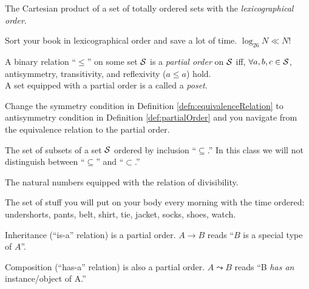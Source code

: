  \begin{exm}
   The Cartesian product of a set of totally ordered sets
   with the \emph{lexicographical order}.
 \end{exm}

 \begin{exm}
   Sort your book in lexicographical order
    and save a lot of time.
   $\log_{26}N \ll N$!
 \end{exm}

 \begin{defn}
   \label{def:partialOrder}
   A binary relation ``$\le$'' on some set ${\cal S}$
    is a \emph{partial order} on ${\cal S}$
    iff, $\forall a,b,c\in{\cal S}$,
    antisymmetry, transitivity, and reflexivity ($a\le a$)
    hold.\\
   A set equipped with a partial order
    is a called a \emph{poset}.
 \end{defn}

 \begin{rem}
   Change the symmetry condition 
   in Definition \ref{defn:equivalenceRelation}
   to antisymmetry condition
   in Definition \ref{def:partialOrder}
   and you navigate from the equivalence relation
   to the partial order.
 \end{rem}

 \begin{exm}
   The set of subsets of a set ${\cal S}$
    ordered by inclusion ``$\subseteq$.''
   In this class we will not distinguish
    between ``$\subseteq$'' and ``$\subset$.''
 \end{exm}

 \begin{exm}
   The natural numbers equipped with the relation of divisibility.
 \end{exm}

 \begin{exm}
   The set of stuff you will put on your body every morning
    with the time ordered:
    undershorts, pants, belt, shirt, tie, jacket,
    socks, shoes, watch.
 \end{exm}

 \begin{exm}
   \label{exm:inheritance}
   Inheritance (``is-a'' relation) is a partial order.
   $A \rightarrow B$ reads ``$B$ is a special type of $A$''.
 \end{exm}

 \begin{exm}
   \label{exm:composition}
   Composition (``has-a'' relation) is also a partial order.
   $A \leadsto B$ reads
     ``B \emph{has an} instance/object of A.''
 \end{exm}

